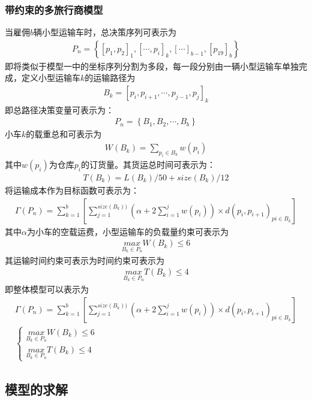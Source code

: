 \documentclass{whutmod}
\begin{document}
	  \subsubsection{带约束的多旅行商模型}
	  当雇佣$b$辆小型运输车时，总决策序列可表示为
	  \begin{gather}
	  P_n=\left \{[p_{1},p_{2}]_1,[\cdots,p_{i}]_k,[\cdots]_{b-1},[p_{19}]_b\right \}
	  \end{gather}
	  即将类似于模型一中的坐标序列分割为多段，每一段分别由一辆小型运输车单独完成，定义小型运输车$k$的运输路径为
	  \begin{gather}
	  B_k=[p_{i},p_{i+1},\cdots,p_{j-1},p_{j}]_k
	  \end{gather}
	  即总路径决策变量可表示为：
	  \begin{gather}
	  P_n=\left \{B_1,B_2,\cdots,B_b\right \}
	  \end{gather}
	  小车$k$的载重总和可表示为
	   \begin{gather}
	   W (B_k)=\sum_{p_i\in B_k}w(p_{i})
	    \end{gather}
	  其中$w(p_{i})$为仓库$p_{i}$的订货量。其货运总时间可表示为：
	   \begin{gather}
	  T (B_k)=L(B_k)/50+size(B_k)/12
	  \end{gather}
	  将运输成本作为目标函数可表示为：
	  \begin{gather}
	  \Gamma (P_n)=\sum _{k=1}^b[\sum _{j=1}^{size(B_k))}(\alpha+2\sum _{i=1}^jw(p_i))\times d(p_i,p_{i+1})_{pi\in B_k}]
	  \end{gather}
	  其中$\alpha$为小车的空载运费，小型运输车的负载量约束可表示为
	  \begin{gather}
	  \underset{B_k\in P_n}{max}  W (B_k) \leqslant 6
	  \end{gather}
	  其运输时间约束可表示为时间约束可表示为
	   \begin{gather}
	       \underset{B_k\in P_n}{max}  T (B_k) \leqslant 4
	   \end{gather}
	   即整体模型可以表示为
	     \begin{gather}
	     \Gamma (P_n)=\sum _{k=1}^b[\sum _{j=1}^{size(B_k))}(\alpha+2\sum _{i=1}^jw(p_i))\times d(p_i,p_{i+1})_{pi\in B_k}]\\
	     \left\{\begin{matrix}\underset{B_k\in P_n}{max}  W (B_k) \leqslant 6
	     \\ \underset{B_k\in P_n}{max}  T (B_k) \leqslant 4
	     \end{matrix}\right.
	  \end{gather}
      \subsection{模型的求解}
\end{document}
